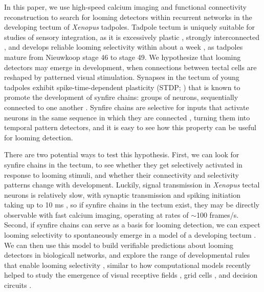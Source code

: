 \documentclass{article}
\begin{document}
In this paper, we use high-speed calcium imaging and functional connectivity reconstruction to search for looming detectors within recurrent networks in the developing tectum of \textit{Xenopus} tadpoles. Tadpole tectum is uniquely suitable for studies of sensory integration, as it is excessively plastic \citep{pratt2007intrinsic, busch2019}, strongly interconnected \citep{james2015}, and develops reliable looming selectivity within about a week \citep{dong2009, khakhalin2014}, as tadpoles mature from Nieuwkoop stage 46 to stage 49. We hypothesize that looming detectors may emerge in development, when connections between tectal cells are reshaped by patterned visual stimulation. Synapses in the tectum of young tadpoles exhibit spike-time-dependent plasticity (STDP; \citealt{zhang1998stdp, mu2006stdp, vislay2006rf, richards2010stdp}) that is known to promote the development of synfire chains: groups of neurons, sequentially connected to one another \citep{fiete2010chains, zheng2014synfire}. Synfire chains are selective for inputs that activate neurons in the same sequence in which they are connected \citep{clopath2010stdpcoding}, turning them into temporal pattern detectors, and it is easy to see how this property can be useful for looming detection. 

There are two potential ways to test this hypothesis. First, we can look for synfire chains in the tectum, to see whether they get selectively activated in response to looming stimuli, and whether their connectivity and selectivity patterns change with development. Luckily, signal transmission in \textit{Xenopus} tectal neurons is relatively slow, with synaptic transmission and spiking initiation taking up to 10 ms \citep{ciarleglio2015, jang2016, busch2019}, so if synfire chains in the tectum exist, they may be directly observable with fast calcium imaging, operating at rates of $\sim$100 frames/s. Second, if synfire chains can serve as a basis for looming detection, we can expect looming selectivity to spontaneously emerge in a model of a developing tectum \citep{gao2015simplicity, pietri2017emergence}. We can then use this model to build verifiable predictions about looming detectors in biologicall networks, and explore the range of developmental rules that enable looming selectivity \citep{linderman2017constrain, bassett2018models}, similar to how computational models recently helped to study the emergence of visual receptive fields \citep{bashivan2018neural}, grid cells \citep{banino2018grid}, and decision circuits \citep{haesemeyer2018convergent}. 
\end{document}
